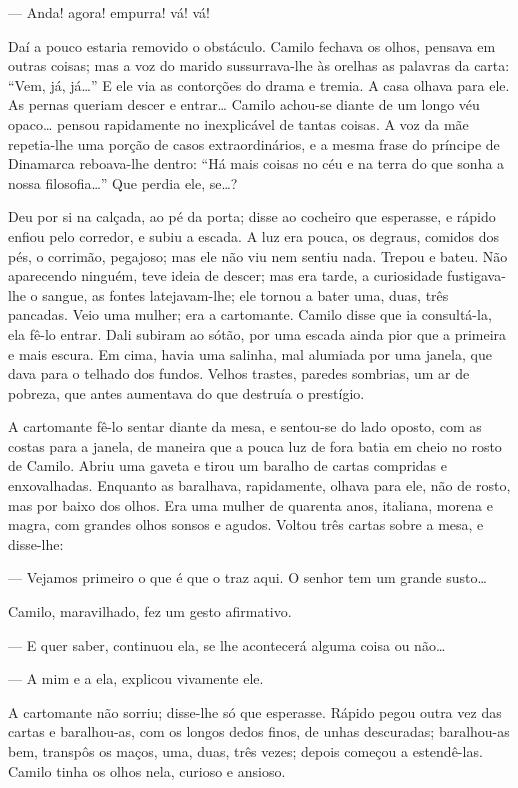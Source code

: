 --- Anda! agora! empurra! vá! vá!

Daí a pouco estaria removido o obstáculo. Camilo fechava os olhos,
pensava em outras coisas; mas a voz do marido sussurrava-lhe às orelhas
as palavras da carta: ``Vem, já, já\ldots{}'' E ele via as contorções do
drama e tremia. A casa olhava para ele. As pernas queriam descer e
entrar\ldots{} Camilo achou-se diante de um longo véu opaco\ldots{}
pensou rapidamente no inexplicável de tantas coisas. A voz da mãe
repetia-lhe uma porção de casos extraordinários, e a mesma frase do
príncipe de Dinamarca reboava-lhe dentro: ``Há mais coisas no céu e na
terra do que sonha a nossa filosofia\ldots{}'' Que perdia ele,
se\ldots{}?

Deu por si na calçada, ao pé da porta; disse ao cocheiro que esperasse,
e rápido enfiou pelo corredor, e subiu a escada. A luz era pouca, os
degraus, comidos dos pés, o corrimão, pegajoso; mas ele não viu nem
sentiu nada. Trepou e bateu. Não aparecendo ninguém, teve ideia de
descer; mas era tarde, a curiosidade fustigava-lhe o sangue, as fontes
latejavam-lhe; ele tornou a bater uma, duas, três pancadas. Veio uma
mulher; era a cartomante. Camilo disse que ia consultá-la, ela fê-lo
entrar. Dali subiram ao sótão, por uma escada ainda pior que a primeira
e mais escura. Em cima, havia uma salinha, mal alumiada por uma janela,
que dava para o telhado dos fundos. Velhos trastes, paredes sombrias, um
ar de pobreza, que antes aumentava do que destruía o prestígio.

A cartomante fê-lo sentar diante da mesa, e sentou-se do lado oposto,
com as costas para a janela, de maneira que a pouca luz de fora batia em
cheio no rosto de Camilo. Abriu uma gaveta e tirou um baralho de cartas
compridas e enxovalhadas. Enquanto as baralhava, rapidamente, olhava
para ele, não de rosto, mas por baixo dos olhos. Era uma mulher de
quarenta anos, italiana, morena e magra, com grandes olhos sonsos e
agudos. Voltou três cartas sobre a mesa, e disse-lhe:

--- Vejamos primeiro o que é que o traz aqui. O senhor tem um grande
susto\ldots{}

Camilo, maravilhado, fez um gesto afirmativo.

--- E quer saber, continuou ela, se lhe acontecerá alguma coisa ou
não\ldots{}

--- A mim e a ela, explicou vivamente ele.

A cartomante não sorriu; disse-lhe só que esperasse. Rápido pegou outra
vez das cartas e baralhou-as, com os longos dedos finos, de unhas
descuradas; baralhou-as bem, transpôs os maços, uma, duas, três vezes;
depois começou a estendê-las. Camilo tinha os olhos nela, curioso e
ansioso.

